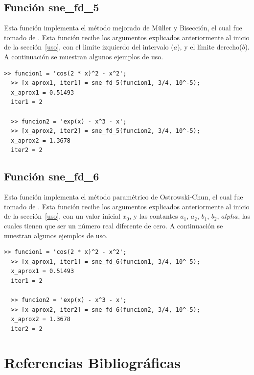 \documentclass[12pt]{article}
\begin{document}
\subsection{Función sne\_fd\_5}
Esta función implementa el método mejorado de Müller y Bisección, el cual fue tomado de \cite{wu2005improved}. Esta función recibe los argumentos explicados anteriormente al inicio de la sección~\ref{uso}, con el limite izquierdo del intervalo ($a$), y el límite derecho($b$). A continuación se muestran algunos ejemplos de uso.

\begin{minipage}{\linewidth}
\begin{lstlisting}[frame = single]
  >> funcion1 = 'cos(2 * x)^2 - x^2';
  >> [x_aprox1, iter1] = sne_fd_5(funcion1, 3/4, 10^-5);
  x_aprox1 = 0.51493
  iter1 = 2

  >> funcion2 = 'exp(x) - x^3 - x';
  >> [x_aprox2, iter2] = sne_fd_5(funcion2, 3/4, 10^-5);
  x_aprox2 = 1.3678
  iter2 = 2
\end{lstlisting}
\end{minipage}

\subsection{Función sne\_fd\_6}
Esta función implementa el método paramétrico de Ostrowski-Chun, el cual fue tomado de \cite{cordero2015solving}. Esta función recibe los argumentos explicados anteriormente al inicio de la sección~\ref{uso}, con un valor inicial $x_{0}$, y las contantes $a_{1}$, $a_{2}$, $b_{1}$, $b_{2}$, $alpha$, las cuales tienen que ser un número real diferente de cero. A continuación se muestran algunos ejemplos de uso.

\begin{minipage}{\linewidth}
\begin{lstlisting}[frame = single]
  >> funcion1 = 'cos(2 * x)^2 - x^2';
  >> [x_aprox1, iter1] = sne_fd_6(funcion1, 3/4, 10^-5);
  x_aprox1 = 0.51493
  iter1 = 2

  >> funcion2 = 'exp(x) - x^3 - x';
  >> [x_aprox2, iter2] = sne_fd_6(funcion2, 3/4, 10^-5);
  x_aprox2 = 1.3678
  iter2 = 2
\end{lstlisting}
\end{minipage}

\newpage
\section{Referencias Bibliográficas}
\nocite{*}

\end{document}
